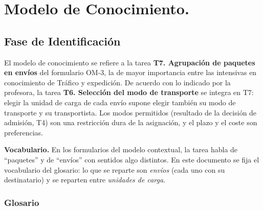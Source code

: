 \documentclass[12pt,a4paper,twoside,spanish]{article}      %
\begin{document}
 \pagestyle{myheadings} 

\setlength{\parindent}{1,5cm} \setlength{\parskip}{0,7cm}


\section{Modelo de Conocimiento.}

\subsection{Fase de Identificación}

El modelo de conocimiento se refiere a la tarea \textbf{T7. Agrupación de
paquetes en envíos} del formulario OM-3, la de mayor importancia entre las
intensivas en conocimiento de Tráfico y expedición. De acuerdo con lo
indicado por la profesora, la tarea \textbf{T6. Selección del modo de
transporte} se integra en T7: elegir la unidad de carga de cada envío supone
elegir también su modo de transporte y su transportista. Los modos
permitidos (resultado de la decisión de admisión, T4) son una restricción
dura de la asignación, y el plazo y el coste son preferencias.

\textbf{Vocabulario.} En los formularios del modelo contextual, la tarea
habla de ``paquetes'' y de ``envíos'' con sentidos algo distintos. En este
documento se fija el vocabulario del glosario: lo que se reparte son
\emph{envíos} (cada uno con su destinatario) y se reparten entre
\emph{unidades de carga}.

\subsubsection{Glosario}
\end{document}
